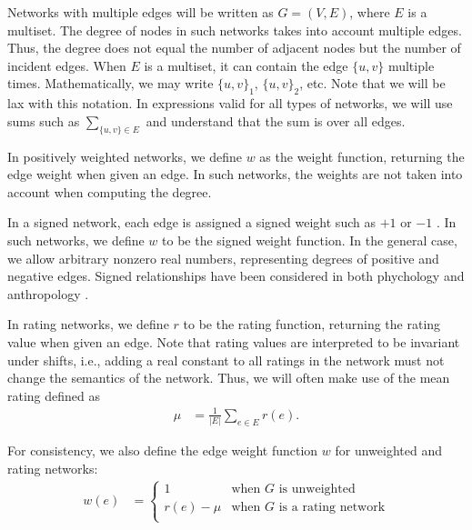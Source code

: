 \documentclass{article}
\begin{document}
Networks with multiple edges will be written as $G=(V,E)$, where $E$ is
a multiset.  The degree of nodes in such networks takes into account
multiple edges. Thus, the degree does not equal the number of adjacent
nodes but the number of incident edges.  When $E$ is a multiset, it can
contain the edge $\{u,v\}$ multiple times.  Mathematically, we 
may write $\{u,v\}_1$, $\{u,v\}_2$, etc.  Note that we will be lax with
this notation.  In expressions valid for all types of networks, we will
use sums such as $\sum_{\{u,v\}\in E}$ and understand that the sum
is over all edges. 

In positively weighted networks, we define $w$ as the
weight function, returning the edge weight when given an edge. In such
networks, the weights are not taken into account when computing the
degree. 

In a signed network, each edge is assigned a signed weight such as $+1$
or $-1$ \cite{b647}.  In such networks, we define $w$ to be the signed weight
function.  In the general case, we allow arbitrary nonzero real numbers,
representing degrees of positive and negative edges.  Signed
relationships have been considered in both phychology \cite{b862} and
anthropology \cite{b323}.  

In rating networks, we define $r$ to be
the rating function, returning the rating value when given an edge.  Note
that rating values are interpreted to be invariant under shifts, i.e.,
adding a real constant to all ratings in the network must not
change the semantics of the network.  Thus, we will often make use of
the mean rating defined as
\begin{align}
  \mu &= \frac 1 {|E|} \sum_{e\in E} r(e). 
\end{align}

For consistency, we also
define the edge weight function $w$ for unweighted and rating networks: 
\begin{align}
  w(e) &= \left\{ \begin{array}{ll} 
    1 & \text{when $G$ is unweighted} \\
    r(e)-\mu & \text{when $G$ is a rating network} \\
    \end{array} \right. 
\end{align}
\end{document}
